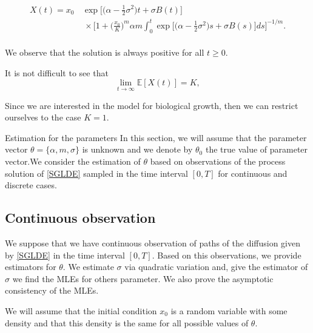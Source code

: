 \documentclass[12pt, reqno]{amsart}
\makeatletter
\def\section{\@startsection{section}{1}%
     \z@{.7\linespacing\@plus\linespacing}{.5\linespacing}%
     {\bfseries
     \centering
     }}
\newcommand{\E}{\mathbb E}
\newcommand{\1}{{\bf 1}}
\newcommand{\2}{{\bf 2}}
\theoremstyle{definition}
\theoremstyle{remark}
\numberwithin{equation}{section}
\makeatother
\begin{document}
\begin{align}\label{sol-SGLDE}
 X(t)=x_0 \,& \exp\Big[  \Big(\alpha-\frac{1}{2}\sigma^2\Big) t + \sigma B(t)\Big] \nonumber \\
 &\, \times \Bigg[ 1 +  \Big(\frac{ x_0}{K}\Big)^m  \alpha m \int_0^t \exp\Big[  \Big(\alpha-\frac{1}{2}\sigma^2\Big)s + \sigma B(s)\Big]  ds \Bigg]^{-1/m}.
\end{align}
\\
 We observe that the solution is always positive for all $t\ge 0$.


It is not difficult to see that 
$$
\lim_{t\rightarrow\infty}  \E [X(t)]= K,
$$


Since we are interested in the model for biological growth, then we can restrict ourselves to the case $K=1$.


\section{Estimation for the parameters}\label{sec-EstPAR}
In this section, we will assume that the parameter vector $\theta=\{\alpha,m,\sigma\}$ is unknown and we denote by $\theta_0$ the true value of parameter vector.We consider the estimation of $\theta$ based on observations of the process solution of \eqref{SGLDE} sampled in the time interval $[0,T]$ for continuous and discrete cases.
\subsection{Continuous observation}\label{sec:con_cas}
We suppose that we have continuous observation of paths of the diffusion given by \eqref{SGLDE} in the time interval $[0,T]$.  Based on this observations, we provide estimators for $\theta$. We estimate $\sigma$ via quadratic variation and, give the estimator of $\sigma$ we find the MLEs for others parameter. We also prove the asymptotic consistency of the MLEs.

We will assume that the initial condition $x_0$ is a random variable with some density and that this density is the same for all possible values of $\theta$.

 
\end{document}
